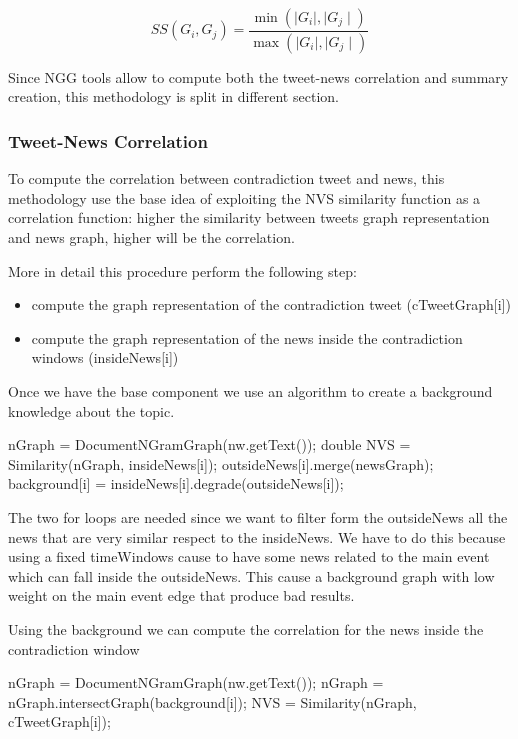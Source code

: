 \begin{equation}
 SS(G_i,G_j)=\frac{\min(\mid G_i \mid, \mid G_j \mid)}{\max(\mid G_i \mid, \mid G_j \mid)}
\end{equation}

Since NGG tools allow to compute both the tweet-news correlation and summary creation, this methodology is split in different section.

\subsubsection*{Tweet-News Correlation}
To compute the correlation between contradiction tweet and news, this methodology use the base idea of exploiting the NVS similarity function as a correlation function: higher the similarity between tweets graph representation and news graph, higher will be the correlation.

More in detail this procedure perform the following step:
\begin{itemize}
	\item compute the graph representation of the contradiction tweet (cTweetGraph[i])
	\item compute the  graph representation of the news inside the contradiction windows (insideNews[i])
\end{itemize}

Once we have the base component we use an algorithm to create a background knowledge about the topic.

\begin{algorithmic}
		\STATE nGraph = DocumentNGramGraph(nw.getText());
		\STATE double NVS = Similarity(nGraph, insideNews[i]);
			\STATE outsideNews[i].merge(newsGraph);
		\ENDIF
	\ENDIF
\ENDFOR
\STATE background[i] = insideNews[i].degrade(outsideNews[i]);
\end{algorithmic}

The two for loops are needed since we want to filter form the outsideNews all the news that are very similar respect to the insideNews. 
We have to do this because using a fixed timeWindows cause to have some news related to the main event which can fall inside the outsideNews.
This cause a background graph with low weight on the main event edge that produce bad results.

Using the background we can compute the correlation for the news inside the contradiction window
\begin{algorithmic}
		\STATE nGraph = DocumentNGramGraph(nw.getText());
        \STATE nGraph = nGraph.intersectGraph(background[i]);
        \STATE NVS = Similarity(nGraph, cTweetGraph[i]);
	\ENDIF
\ENDFOR        
\end{algorithmic}

